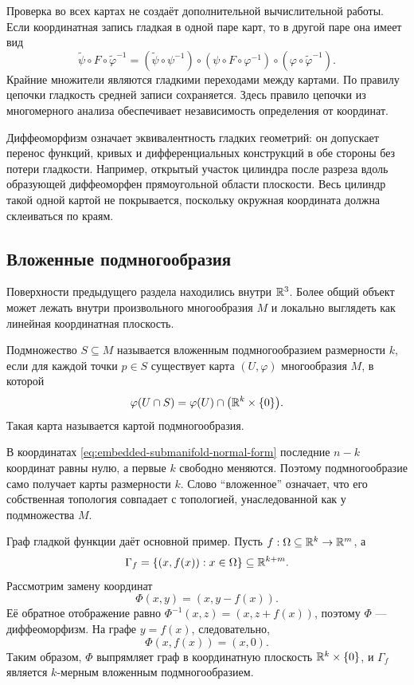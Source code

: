 Проверка во всех картах не создаёт дополнительной вычислительной работы. Если координатная запись гладкая в одной паре карт, то в другой паре она имеет вид
\[
\widetilde\psi\circ F\circ\widetilde\varphi^{-1}
=
(\widetilde\psi\circ\psi^{-1})
\circ
(\psi\circ F\circ\varphi^{-1})
\circ
(\varphi\circ\widetilde\varphi^{-1}).
\]
Крайние множители являются гладкими переходами между картами. По правилу цепочки гладкость средней записи сохраняется. Здесь правило цепочки из многомерного анализа обеспечивает независимость определения от координат.

Диффеоморфизм означает эквивалентность гладких геометрий: он допускает перенос функций, кривых и дифференциальных конструкций в обе стороны без потери гладкости. Например, открытый участок цилиндра после разреза вдоль образующей диффеоморфен прямоугольной области плоскости. Весь цилиндр такой одной картой не покрывается, поскольку окружная координата должна склеиваться по краям.

\subsection{Вложенные подмногообразия}

Поверхности предыдущего раздела находились внутри \(\mathbb{R}^3\). Более общий объект может лежать внутри произвольного многообразия \(M\) и локально выглядеть как линейная координатная плоскость.

\begin{definition}
Подмножество \(S\subseteq M\) называется вложенным подмногообразием размерности \(k\), если для каждой точки \(p\in S\) существует карта \((U,\varphi)\) многообразия \(M\), в которой
\begin{equation}
\label{eq:embedded-submanifold-normal-form}
\varphi(U\cap S)
=
\varphi(U)\cap
\bigl(\mathbb{R}^k\times\{0\}\bigr).
\end{equation}
Такая карта называется картой подмногообразия.
\end{definition}

В координатах \eqref{eq:embedded-submanifold-normal-form} последние \(n-k\) координат равны нулю, а первые \(k\) свободно меняются. Поэтому подмногообразие само получает карты размерности \(k\). Слово ``вложенное'' означает, что его собственная топология совпадает с топологией, унаследованной как у подмножества \(M\).

Граф гладкой функции даёт основной пример. Пусть \(f:\Omega\subseteq\mathbb{R}^k\to\mathbb{R}^m\), а
\[
\Gamma_f
=
\{(x,f(x)):x\in\Omega\}
\subseteq\mathbb{R}^{k+m}.
\]
Рассмотрим замену координат
\begin{equation}
\label{eq:graph-straightening-map}
\Phi(x,y)=(x,y-f(x)).
\end{equation}
Её обратное отображение равно \(\Phi^{-1}(x,z)=(x,z+f(x))\), поэтому \(\Phi\) --- диффеоморфизм. На графе \(y=f(x)\), следовательно,
\[
\Phi(x,f(x))=(x,0).
\]
Таким образом, \(\Phi\) выпрямляет граф в координатную плоскость \(\mathbb{R}^k\times\{0\}\), и \(\Gamma_f\) является \(k\)-мерным вложенным подмногообразием.

